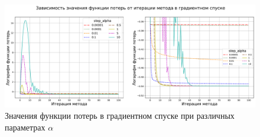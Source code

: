 \documentclass{article}
\begin{document}
\begin{figure}[H]
    \centering
    \includegraphics[width=15cm]{TASK2 step_alpha loss.pdf}
    \caption{Значения функции потерь в градиентном спуске при различных параметрах $\alpha$}
    \label{fig:step_alpfa_loss}
\end{figure}
\end{document}
